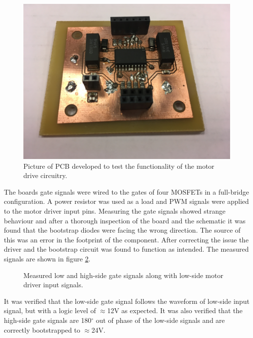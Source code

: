 \begin{figure}
	\centering
	\includegraphics[width=0.5\linewidth]{graphics/hipboard_pic}
	\caption[Prototype PCB with motor driver.]{Picture of PCB developed to test the functionality of the motor drive circuitry.}
	\label{fig:m_drive_circuit}
\end{figure}
The boards gate signals were wired to the gates of four MOSFETs in a full-bridge configuration.
A power resistor was used as a load and PWM signals were applied to the motor driver input pins. 
Measuring the gate signals showed strange behaviour and after a thorough inspection of the board and the schematic it was found that the bootstrap diodes were facing the wrong direction. 
The source of this was an error in the footprint of the component. 
After correcting the issue the driver and the bootstrap circuit was found to function as intended. 
The measured signals are shown in figure \ref{fig:test_hip_signals}.

\begin{figure}[h]
	\centering
	\caption[Measured gate and input signals.]{Measured low and high-side gate signals along with low-side motor driver input signals.}
	\label{fig:test_hip_signals}
\end{figure}
It was verified that the low-side gate signal follows the waveform of low-side input signal, but with a logic level of $\approx$12V as expected. 
It was also verified that the high-side gate signals are 180$^\circ$ out of phase of the low-side signals and are correctly bootstrapped to $\approx$24V.

